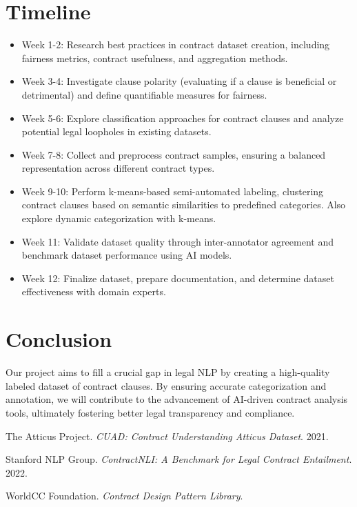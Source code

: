 \documentclass[11pt, oneside]{article}   	%
\begin{document}
\section*{Timeline}
\begin{itemize}
\item Week 1-2: Research best practices in contract dataset creation, including fairness metrics, contract usefulness, and aggregation methods.
\item Week 3-4: Investigate clause polarity (evaluating if a clause is beneficial or detrimental) and define quantifiable measures for fairness.
\item Week 5-6: Explore classification approaches for contract clauses and analyze potential legal loopholes in existing datasets.
\item Week 7-8: Collect and preprocess contract samples, ensuring a balanced representation across different contract types.
\item Week 9-10: Perform k-means-based semi-automated labeling, clustering contract clauses based on semantic similarities to predefined categories. Also explore dynamic categorization with k-means.
\item Week 11: Validate dataset quality through inter-annotator agreement and benchmark dataset performance using AI models.
\item Week 12: Finalize dataset, prepare documentation, and determine dataset effectiveness with domain experts.
\end{itemize}
\section*{Conclusion}
Our project aims to fill a crucial gap in legal NLP by creating a high-quality labeled dataset of contract clauses. By ensuring accurate categorization and annotation, we will contribute to the advancement of AI-driven contract analysis tools, ultimately fostering better legal transparency and compliance.

\begin{thebibliography}{9}

	The Atticus Project.
	\textit{CUAD: Contract Understanding Atticus Dataset}.
	2021.
	
	Stanford NLP Group.
	\textit{ContractNLI: A Benchmark for Legal Contract Entailment}.
	2022.

		WorldCC Foundation.
		\textit{Contract Design Pattern Library}.
		

	\end{thebibliography}
\end{document}
